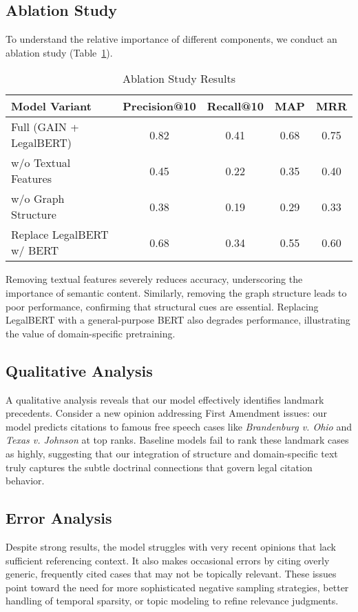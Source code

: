 \documentclass{article}
\begin{document}
\subsection{Ablation Study}
To understand the relative importance of different components, we conduct an ablation study (Table~\ref{tab:ablation}).

\begin{table}[H]
    \centering
    \caption{Ablation Study Results}
    \label{tab:ablation}
    \begin{tabular}{lcccc}
    \toprule
    \textbf{Model Variant} & \textbf{Precision@10} & \textbf{Recall@10} & \textbf{MAP} & \textbf{MRR} \\
    \midrule
    Full (GAIN + LegalBERT) & 0.82 & 0.41 & 0.68 & 0.75 \\
    w/o Textual Features & 0.45 & 0.22 & 0.35 & 0.40 \\
    w/o Graph Structure & 0.38 & 0.19 & 0.29 & 0.33 \\
    Replace LegalBERT w/ BERT & 0.68 & 0.34 & 0.55 & 0.60 \\
    \bottomrule
    \end{tabular}
\end{table}

Removing textual features severely reduces accuracy, underscoring the importance of semantic content. Similarly, removing the graph structure leads to poor performance, confirming that structural cues are essential. Replacing LegalBERT with a general-purpose BERT also degrades performance, illustrating the value of domain-specific pretraining.

\subsection{Qualitative Analysis}
A qualitative analysis reveals that our model effectively identifies landmark precedents. Consider a new opinion addressing First Amendment issues: our model predicts citations to famous free speech cases like \emph{Brandenburg v. Ohio} and \emph{Texas v. Johnson} at top ranks. Baseline models fail to rank these landmark cases as highly, suggesting that our integration of structure and domain-specific text truly captures the subtle doctrinal connections that govern legal citation behavior.

\subsection{Error Analysis}
Despite strong results, the model struggles with very recent opinions that lack sufficient referencing context. It also makes occasional errors by citing overly generic, frequently cited cases that may not be topically relevant. These issues point toward the need for more sophisticated negative sampling strategies, better handling of temporal sparsity, or topic modeling to refine relevance judgments.
\end{document}
